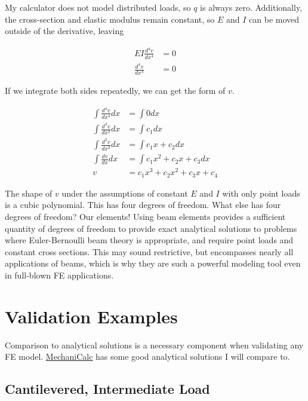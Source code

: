 \documentclass[10pt,letterpaper]{article}
\begin{document}
	My calculator does not model distributed loads, so $q$ is always zero. Additionally, the cross-section and elastic modulus remain constant, so $E$ and $I$ can be moved outside of the derivative, leaving

	\begin{align}
		E I \frac{d^4 v}{d x^4} &= 0 \\
		\frac{d^4 v}{d x^4} &= 0 
	\end{align}

	If we integrate both sides repeatedly, we can get the form of $v$.

	\begin{align}
		\int \frac{d^4 v}{d x^4} dx &= \int 0 dx \\
		\int \frac{d^3 v}{d x^3} dx &= \int c_1 dx \\
		\int \frac{d^2 v}{d x^2} dx &= \int c_1 x + c_2 dx \\
		\int \frac{d v}{d x} dx     &= \int c_1 x^2 + c_2 x + c_3 dx \\
		v &= c_1 x^3 + c_2 x^2 + c_3 x + c_4 
	\end{align}

	The shape of $v$ under the assumptions of constant $E$ and $I$ with only point loads is a cubic polynomial. This has four degrees of freedom. What else has four degrees of freedom? Our elements! Using beam elements provides a sufficient quantity of degrees of freedom to provide exact analytical solutions to problems where Euler-Bernoulli beam theory is appropriate, and require point loads and constant cross sections. This may sound restrictive, but encompasses nearly all applications of beams, which is why they are such a powerful modeling tool even in full-blown FE applications.

	\newpage
	\section{Validation Examples}

	Comparison to analytical solutions is a necessary component when validating any FE model. \href{https://mechanicalc.com/reference/beam-deflection-tables}{\underline{MechaniCalc}} has some good analytical solutions I will compare to.

	\subsection{Cantilevered, Intermediate Load}
\end{document}
